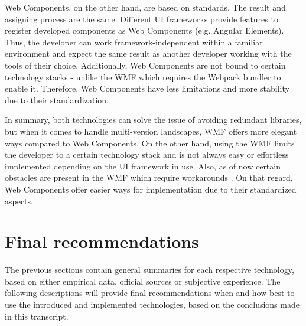 Web Components, on the other hand, are based on standards. 
The result and assigning process are the same. 
Different UI frameworks provide features to register developed components as Web Components (e.g. Angular Elements). 
Thus, the developer can work framework-independent within a familiar environment and expect the same result as another developer working with the tools of their choice.
Additionally, Web Components are not bound to certain technology stacks - unlike the WMF which requires the Webpack bundler to enable it. 
Therefore, Web Components have less limitations and more stability due to their standardization.

In summary, both technologies can solve the issue of avoiding redundant libraries, but when it comes to handle multi-version landscapes, WMF offers more elegant ways compared to Web Components. 
On the other hand, using the WMF limits the developer to a certain technology stack and is not always easy or effortless implemented depending on the UI framework in use. 
Also, as of now certain obstacles are present in the WMF which require workarounds \cite{wmf_the_good_and_ugly}. 
On that regard, Web Components offer easier ways for implementation due to their standardized aspects.

\section{Final recommendations}

The previous sections contain general summaries for each respective technology, based on either empirical data, official sources or subjective experience. 
The following descriptions will provide final recommendations when and how best to use the introduced and implemented technologies, based on the conclusions made in this transcript.

